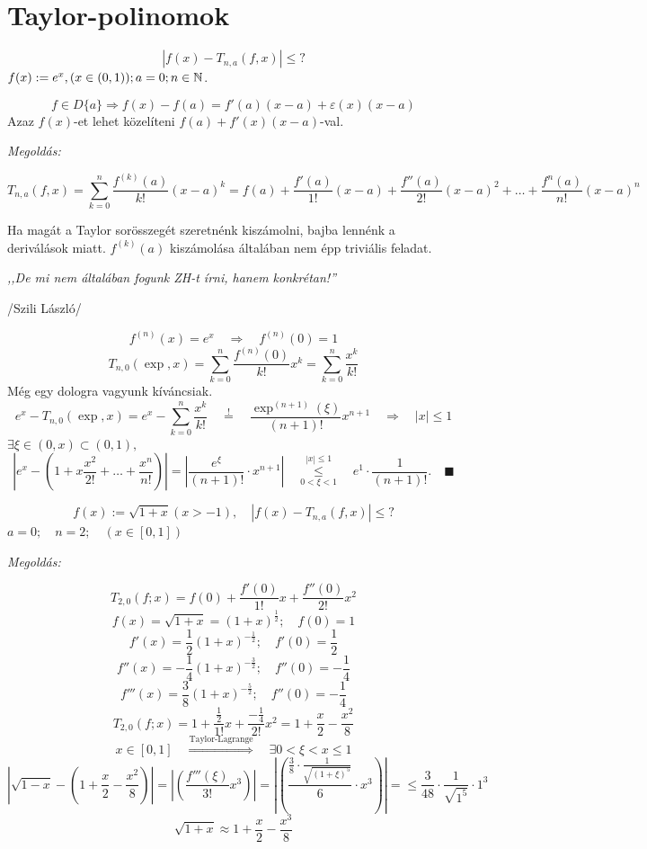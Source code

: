 \documentclass[a4paper,11.5pt]{article}
\begin{document}
	\section{Taylor-polinomok}
	\begin{task}
		\[ |f(x)-T_{n,a}(f,x)|\leq ? \]
		$f(x):=e^x, (x\in(0,1)); a=0; n\in\mathbb{N}$.
		\begin{revision}
			\[ f\in D\{a\} \Rightarrow f(x)-f(a)=f'(a)(x-a)+\varepsilon(x)(x-a) \]
			Azaz $f(x)$-et lehet közelíteni $f(a)+f'(x)(x-a)$-val.
		\end{revision}
		\textit{Megoldás:}
		
		\[ T_{n,a}(f,x)=\sum_{k=0}^n\frac{f^{(k)}(a)}{k!}(x-a)^k=f(a)+\frac{f'(a)}{1!}(x-a)+\frac{f''(a)}{2!}(x-a)^2+\ldots+\frac{f^{n}(a)}{n!}(x-a)^n \]
		\begin{note}
			Ha magát a Taylor sorösszegét szeretnénk kiszámolni, bajba lennénk a deriválások miatt. $f^{(k)}(a)$ kiszámolása általában nem épp triviális feladat.
			\begin{center}
				\textit{,,De mi nem általában fogunk ZH-t írni, hanem konkrétan!''}
				\smallskip
				
				/Szili László/
			\end{center}
		\end{note}
		\[ f^{(n)}(x)=e^x\quad  \Rightarrow \quad f^{(n)}(0)=1  \]
		\[ T_{n,0}(\exp, x)=\sum_{k=0}^n\frac{f^{(n)}(0)}{k!}x^k=\sum_{k=0}^n\frac{x^k}{k!} \]
		Még egy dologra vagyunk kíváncsiak.
		\[ e^x-T_{n,0}(\exp,x)=e^x-\sum_{k=0}^n\frac{x^k}{k!}\quad \overset{!}{=}\quad \frac{\exp^{(n+1)}(\xi)}{(n+1)!}x^{n+1} \quad \Rightarrow\quad |x|\leq1 \]
		$\exists \xi\in(0,x)\subset(0,1),$
		\[ \left|e^x-\left(1+x\frac{x^2}{2!}+\ldots+\frac{x^n}{n!}\right)\right|=\left|\frac{e^\xi}{(n+1)!}\cdot x^{n+1}\right|\quad \overset{|x|\leq1}{\underset{0<\xi<1}{\leq}}\quad e^1\cdot\frac{1}{(n+1)!}.\quad \blacksquare \]
	\end{task}
	\begin{task}
		\[ f(x):=\sqrt{1+x} (x>-1),\quad |f(x)-T_{n,a}(f,x)|\leq? \]
		$a=0;\quad  n=2;\quad (x\in[0,1])$
		
		\textit{Megoldás:}
		
		\[ T_{2,0}(f;x)=f(0)+\frac{f'(0)}{1!}x+\frac{f''(0)}{2!}x^2 \]
		\[ f(x)=\sqrt{1+x}=(1+x)^{\frac{1}{2}};\quad f(0)=1 \]
		\[ f'(x)=\frac{1}{2}(1+x)^{-\frac{1}{2}};\quad f'(0)=\frac{1}{2} \]
		\[ f''(x)=-\frac{1}{4}(1+x)^{-\frac{3}{2}};\quad f''(0)=-\frac{1}{4} \]
		\[ f'''(x)=\frac{3}{8}(1+x)^{-\frac{5}{2}};\quad f''(0)=-\frac{1}{4} \]
		\[ T_{2,0}(f;x)=1+\frac{\frac{1}{2}}{1!}x+\frac{-\frac{1}{4}}{2!}x^2=1+\frac{x}{2}-\frac{x^2}{8} \]
		\[ x\in[0,1] \quad \overset{\text{Taylor-Lagrange}}{\Longrightarrow}\quad \exists0<\xi<x\leq1 \]
		\[ \left|\sqrt{1-x}-\left(1+\frac{x}{2}-\frac{x^2}{8}\right)\right|= \left|\left(\frac{f'''(\xi)}{3!}x^3\right)\right|=\left|\left( \frac{ \frac{3}{8}\cdot\frac{1}{\sqrt{(1+\xi)^5}} }{6}\cdot x^3\right)\right|=\leq \frac{3}{48}\cdot\frac{1}{\sqrt{1^5}}\cdot1^3 \]
		\[ \sqrt{1+x}\approx1+\frac{x}{2}-\frac{x^3}{8} \]
	\end{task}
	
\end{document}
